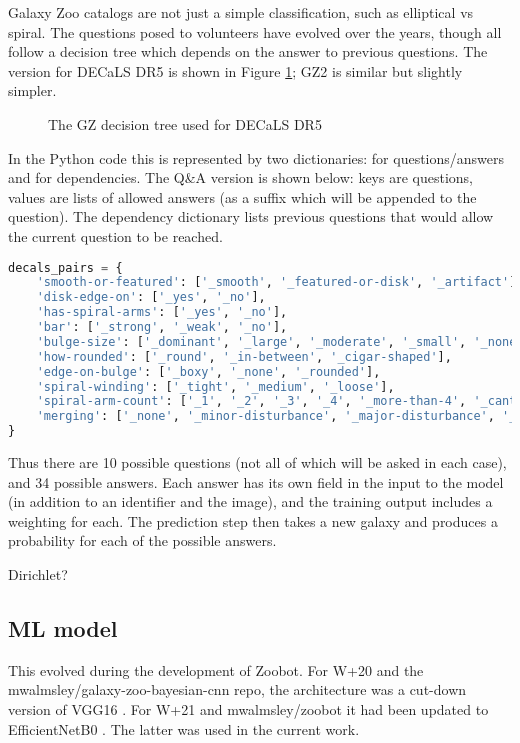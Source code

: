 \documentclass[preprint]{aastex631}
\newcommand{\todo}{\color{red}{TODO}\color{black}\hspace{2mm}}
\begin{document}
Galaxy Zoo catalogs are not just a simple classification, such as elliptical vs spiral. The questions posed to volunteers have evolved over the years, though all follow a decision tree which depends on the answer to previous questions. The version for DECaLS DR5 is shown in Figure \ref{fig:decals_decisions}; GZ2 is similar but slightly simpler.

\begin{figure}[htb!]
	\caption{The GZ decision tree used for DECaLS DR5
		\label{fig:decals_decisions}}
\end{figure}

In the Python code this is represented by two dictionaries: for questions/answers and for dependencies. The Q\&A version is shown below: keys are questions, values are lists of allowed answers (as a suffix which will be appended to the question). The dependency dictionary lists previous questions that would allow the current question to be reached.

\begin{lstlisting}[language=Python]
decals_pairs = {
	'smooth-or-featured': ['_smooth', '_featured-or-disk', '_artifact'],
	'disk-edge-on': ['_yes', '_no'],
	'has-spiral-arms': ['_yes', '_no'],
	'bar': ['_strong', '_weak', '_no'],
	'bulge-size': ['_dominant', '_large', '_moderate', '_small', '_none'],
	'how-rounded': ['_round', '_in-between', '_cigar-shaped'],
	'edge-on-bulge': ['_boxy', '_none', '_rounded'],
	'spiral-winding': ['_tight', '_medium', '_loose'],
	'spiral-arm-count': ['_1', '_2', '_3', '_4', '_more-than-4', '_cant-tell'],
	'merging': ['_none', '_minor-disturbance', '_major-disturbance', '_merger']
}
\end{lstlisting}

Thus there are 10 possible questions (not all of which will be asked in each case), and 34 possible answers. Each answer has its own field in the input to the model (in addition to an identifier and the image), and the training output includes a weighting for each. The prediction step then takes a new galaxy and produces a probability for each of the possible answers.

\todo Dirichlet?

\subsection{ML model} \label{model}

This evolved during the development of Zoobot. For W+20 and the mwalmsley/galaxy-zoo-bayesian-cnn repo, the architecture was a cut-down version of VGG16 \citep{2014arXiv1409.1556S}. For W+21 and mwalmsley/zoobot it had been updated to EfficientNetB0 \citep{2019arXiv190511946T}. The latter was used in the current work.
\end{document}

